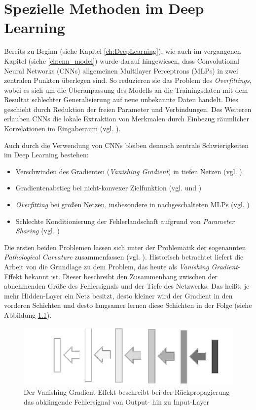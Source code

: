 \chapter{Spezielle Methoden im Deep Learning}
Bereits zu Beginn (siehe Kapitel \ref{ch:DeepLearning}), wie auch im vergangenen Kapitel (siehe \ref{ch:cnn_model}) wurde darauf hingewiesen, dass Convolutional Neural Networks (CNNs) allgemeinen Multilayer Perceptrons (MLPs) in zwei zentralen Punkten überlegen sind. So reduzieren sie das Problem des \textit{Overfittings}, wobei es sich um die Überanpassung des Modells an die Trainingsdaten mit dem Resultat schlechter Generalisierung auf neue unbekannte Daten handelt. Dies geschieht durch Reduktion der freien Parameter und Verbindungen. Des Weiteren erlauben CNNs die lokale Extraktion von Merkmalen durch Einbezug räumlicher Korrelationen im Eingaberaum (vgl. \cite{LeCun1998}). 

Auch durch die Verwendung von CNNs bleiben dennoch zentrale Schwierigkeiten im Deep Learning bestehen:
\begin{itemize}
\item Verschwinden des Gradienten (\textit{Vanishing Gradient}) in tiefen Netzen (vgl. \cite{Hochreiter1991})
\item Gradientenabstieg bei nicht-konvexer Zielfunktion (vgl. \cite{Martens2010} und \cite{Dauphin14})
\item \textit{Overfitting} bei großen Netzen, insbesondere in nachgeschalteten MLPs (vgl. \cite{Hinton2012})
\item Schlechte Konditionierung der Fehlerlandschaft aufgrund von \textit{Parameter Sharing} (vgl. \cite{LeCun1998})
\end{itemize}

Die ersten beiden Problemen lassen sich unter der Problematik der sogenannten \textit{Pathological Curvature} zusammenfassen (vgl. \cite{Martens2010}). Historisch betrachtet liefert die Arbeit von \cite{Hochreiter1991} die Grundlage zu dem Problem, das heute als \textit{Vanishing Gradient}-Effekt bekannt ist. Dieser beschreibt den Zusammenhang zwischen der abnehmenden Größe des Fehlersignals und der Tiefe des Netzwerks. Das heißt, je mehr Hidden-Layer ein Netz besitzt, desto kleiner wird der Gradient in den vorderen Schichten und desto langsamer lernen diese Schichten in der Folge (siehe Abbildung \ref{fig:4_vanishing_gradient}).

\begin{figure}
\centering
\includegraphics[width=0.7\linewidth]{images/4_vanishing_gradient}
\caption[]{Der Vanishing Gradient-Effekt beschreibt bei der Rückpropagierung das abklingende Fehlersignal von Output- hin zu Input-Layer}
\label{fig:4_vanishing_gradient}
\end{figure}

